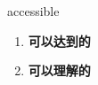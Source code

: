 
\begin{frame}
{\huge accessible}
\begin{center}
\begin{enumerate}\Large
  \item \textbf{可以达到的}
  \item \textbf{可以理解的}
\end{enumerate}
\end{center}
\end{frame}

